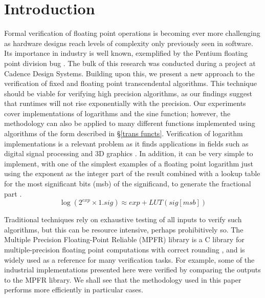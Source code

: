 \documentclass{fac}
\begin{document}
\section{Introduction}
\label{intro}
Formal verification of floating point operations is becoming ever more challenging as hardware designs reach levels of complexity only previously seen in software. Its importance in industry is well known, exemplified by the Pentium floating point division bug \cite{pratt1995anatomy}. The bulk of this research was conducted during a project at Cadence Design Systems. Building upon this, we present a new approach to the verification of fixed and floating point transcendental algorithms. This technique should be viable for verifying high precision algorithms, as our findings suggest that runtimes will not rise exponentially with the precision.  Our experiments cover implementations of logarithms and the sine function; however, the methodology can also be applied to many different functions implemented using algorithms of the form described in \S \ref{trans functs}. Verification of logarithm implementations is a relevant problem as it finds applications in fields such as digital signal processing and 3D graphics \cite{lewis1995114,harris2001powering}. In addition, it can be very simple to implement, with one of the simplest examples of a floating point logarithm just using the exponent as the integer part of the result combined with a lookup table for the most significant bits (msb) of the significand, to generate the fractional part \cite{harris2001powering}.
\begin{equation*}
    \log(2^{\textit{exp}} \times 1.sig) \approx \textit{exp} + LUT(\textit{sig}[msb])
\end{equation*}

Traditional techniques rely on exhaustive testing of all inputs to verify such algorithms, but this can be resource intensive, perhaps prohibitively so. The Multiple Precision Floating-Point Reliable (MPFR) library is a C library for multiple-precision floating point computations with correct rounding \cite{fousse2007mpfr}, and is widely used as a reference for many verification tasks. For example, some of the industrial implementations presented here were verified by comparing the outputs to the MPFR library. We shall see that the methodology used in this paper performs more efficiently in particular cases. 
\end{document}
